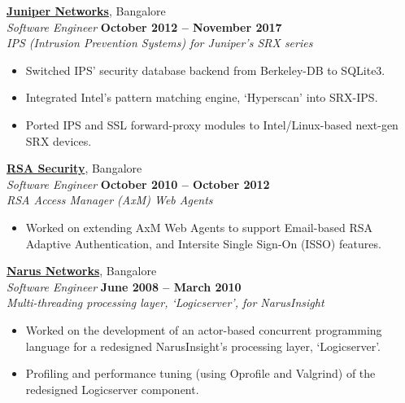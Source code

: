 \documentclass[9pt]{article}
\begin{document}
    \href{http://www.juniper.net}{\textbf{Juniper Networks}}, Bangalore \\%
    \textsl{Software Engineer} \hfill \textbf{October 2012 -- November 2017}\\%
    
	\textsl{IPS (Intrusion Prevention Systems) for Juniper's SRX series}
	\begin{itemize}
		\item Switched IPS' security database backend from Berkeley-DB to SQLite3.%
        \item Integrated Intel's pattern matching engine, `Hyperscan' into SRX-IPS.%
		\item Ported IPS and SSL forward-proxy modules to Intel/Linux-based next-gen SRX devices.\vspace{1mm}\\\vspace{1mm}%
	\end{itemize}

    \href{http://www.rsa.com/}{\textbf{RSA Security}}, Bangalore \\%
    \textsl{Software Engineer} \hfill \textbf{October 2010 -- October 2012}\\%
    
	\textsl{RSA Access Manager (AxM) Web Agents}
	\begin{itemize}
		\item Worked on extending AxM Web Agents to support Email-based RSA Adaptive Authentication, and Intersite Single Sign-On (ISSO) features.\vspace{0mm}\\\vspace{1mm}%
	\end{itemize}

    \pagebreak %

    \href{https://en.wikipedia.org/wiki/Narus_(company)}{\textbf{Narus Networks}}, Bangalore \\%
    \textsl{Software Engineer} \hfill \textbf{June 2008 -- March 2010}\\%
	
   \textsl{Multi-threading processing layer, `Logicserver', for NarusInsight}
	\begin{itemize}
		\item Worked on the development of an actor-based concurrent programming language for a redesigned NarusInsight's processing layer, `Logicserver'. %
		\item Profiling and performance tuning (using Oprofile and Valgrind) of the redesigned Logicserver component. %
	\end{itemize}
\end{document}
